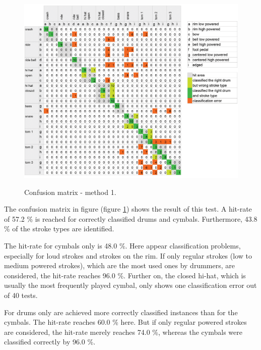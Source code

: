 


\begin{figure}[htb]
	\centering
	\includegraphics[width=\textwidth]{images/classification_matrix/matrix_test_1.png}
	\label{}
	\caption{Confusion matrix - method 1.}
	\label{fig:matrix1}
\end{figure}

The confusion matrix in figure (figure \ref{fig:matrix1}) shows the  result of this test. A hit-rate of 57.2 \% is reached for correctly classified drums and cymbals. Furthermore, 43.8 \% of the stroke types are identified.

The hit-rate for cymbals only is 48.0 \%. Here appear classification problems, especially for loud strokes and strokes on the rim. If only regular strokes (low to medium powered strokes), which are the most used ones by drummers, are considered, the hit-rate reaches 96.0 \%. Further on, the closed hi-hat, which is usually the most frequently played cymbal, only shows one classification error out of 40 tests.

For drums only are achieved more correctly classified instances than for the cymbals. The hit-rate reaches 60.0 \% here. But if only regular powered strokes are considered, the hit-rate merely reaches 74.0 \%, whereas the cymbals were classified correctly by 96.0 \%.

